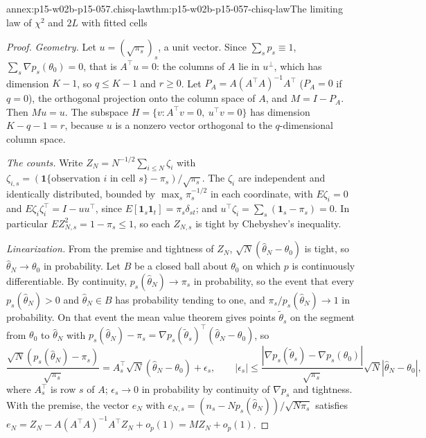\begin{annexitem}{annex:p15-w02b-p15-057.chisq-law}{thm:p15-w02b-p15-057-chisq-law}{The limiting law of \(\chi^2\) and \(2L\) with fitted cells}
\begin{proof}
\emph{Geometry.} Let \(u=(\sqrt{\pi_s})_s\), a unit vector. Since
\(\sum_sp_s\equiv1\), \(\sum_s\nabla p_s(\theta_0)=0\), that is
\(A^{\top}u=0\): the columns of \(A\) lie in \(u^\perp\), which has dimension
\(K-1\), so \(q\leq K-1\) and \(r\geq0\). Let \(P_A=A(A^{\top}A)^{-1}A^{\top}\)
(\(P_A=0\) if \(q=0\)), the orthogonal projection onto the column space of
\(A\), and \(M=I-P_A\). Then \(Mu=u\). The subspace
\(H=\{v:A^{\top}v=0,\ u^{\top}v=0\}\) has dimension \(K-q-1=r\), because
\(u\) is a nonzero vector orthogonal to the \(q\)-dimensional column space.

\emph{The counts.} Write \(Z_N=N^{-1/2}\sum_{i\leq N}\zeta_i\) with
\(\zeta_{i,s}=(\mathbf 1\{\text{observation }i\text{ in cell }s\}-\pi_s)/\sqrt{\pi_s}\).
The \(\zeta_i\) are independent and identically distributed, bounded by
\(\max_s\pi_s^{-1/2}\) in each coordinate, with \(E\zeta_i=0\) and
\(E\zeta_i\zeta_i^{\top}=I-uu^{\top}\), since
\(E[\mathbf 1_s\mathbf 1_t]=\pi_s\delta_{st}\); and
\(u^{\top}\zeta_i=\sum_s(\mathbf 1_s-\pi_s)=0\). In particular
\(EZ_{N,s}^2=1-\pi_s\leq1\), so each \(Z_{N,s}\) is tight by Chebyshev's
inequality.

\emph{Linearization.} From the premise and tightness of \(Z_N\),
\(\sqrt N(\widehat\theta_N-\theta_0)\) is tight, so
\(\widehat\theta_N\to\theta_0\) in probability. Let \(B\) be a closed ball
about \(\theta_0\) on which \(p\) is continuously differentiable. By
continuity, \(p_s(\widehat\theta_N)\to\pi_s\) in probability, so the event
that every \(p_s(\widehat\theta_N)>0\) and \(\widehat\theta_N\in B\) has
probability tending to one, and \(\pi_s/p_s(\widehat\theta_N)\to1\) in
probability. On that event the mean value theorem gives points
\(\tilde\theta_s\) on the segment from \(\theta_0\) to \(\widehat\theta_N\)
with \(p_s(\widehat\theta_N)-\pi_s=\nabla p_s(\tilde\theta_s)^{\top}
(\widehat\theta_N-\theta_0)\), so
\[
 \frac{\sqrt N(p_s(\widehat\theta_N)-\pi_s)}{\sqrt{\pi_s}}
 =A_s^{\top}\sqrt N(\widehat\theta_N-\theta_0)+\epsilon_s,\qquad
 |\epsilon_s|\leq\frac{|\nabla p_s(\tilde\theta_s)-\nabla p_s(\theta_0)|}
 {\sqrt{\pi_s}}\sqrt N|\widehat\theta_N-\theta_0|,
\]
where \(A_s^{\top}\) is row \(s\) of \(A\); \(\epsilon_s\to0\) in probability
by continuity of \(\nabla p_s\) and tightness. With the premise, the vector
\(e_N\) with \(e_{N,s}=(n_s-Np_s(\widehat\theta_N))/\sqrt{N\pi_s}\) satisfies
\(e_N=Z_N-A(A^{\top}A)^{-1}A^{\top}Z_N+o_p(1)=MZ_N+o_p(1)\).


\end{proof}
\end{annexitem}
